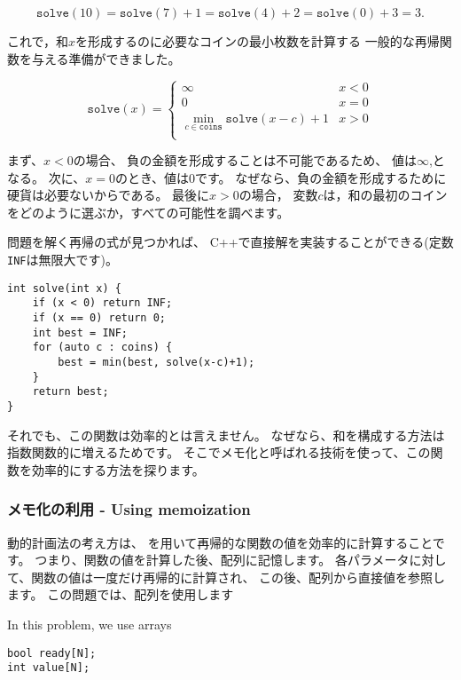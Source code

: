 \[ \texttt{solve}(10) = \texttt{solve}(7)+1 = \texttt{solve}(4)+2 = \texttt{solve}(0)+3 = 3.\]

これで，和$x$を形成するのに必要なコインの最小枚数を計算する
一般的な再帰関数を与える準備ができました。

\begin{equation*}
    \texttt{solve}(x) = \begin{cases}
               \infty               & x < 0\\
               0               & x = 0\\
               \min_{c \in \texttt{coins}} \texttt{solve}(x-c)+1 & x > 0 \\
           \end{cases}
\end{equation*}

まず、$x<0$の場合、
負の金額を形成することは不可能であるため、
値は$\infty$,となる。
次に、$x = 0$のとき、値は$0$です。
なぜなら、負の金額を形成するために 硬貨は必要ないからである。
最後に$x > 0$の場合，
変数$c$は，和の最初のコインをどのように選ぶか，すべての可能性を調べます。

問題を解く再帰の式が見つかれば、
C++で直接解を実装することができる(定数\texttt{INF}は無限大です)。

\begin{lstlisting}
int solve(int x) {
    if (x < 0) return INF;
    if (x == 0) return 0;
    int best = INF;
    for (auto c : coins) {
        best = min(best, solve(x-c)+1);
    }
    return best;
}
\end{lstlisting}

それでも、この関数は効率的とは言えません。
なぜなら、和を構成する方法は指数関数的に増えるためです。
そこでメモ化と呼ばれる技術を使って、この関数を効率的にする方法を探ります。

\subsubsection{メモ化の利用 - Using memoization}


動的計画法の考え方は、
を用いて再帰的な関数の値を効率的に計算することです。
つまり、関数の値を計算した後、配列に記憶します。
各パラメータに対して、関数の値は一度だけ再帰的に計算され、
この後、配列から直接値を参照します。
この問題では、配列を使用します


In this problem, we use arrays
\begin{lstlisting}
bool ready[N];
int value[N];
\end{lstlisting}


